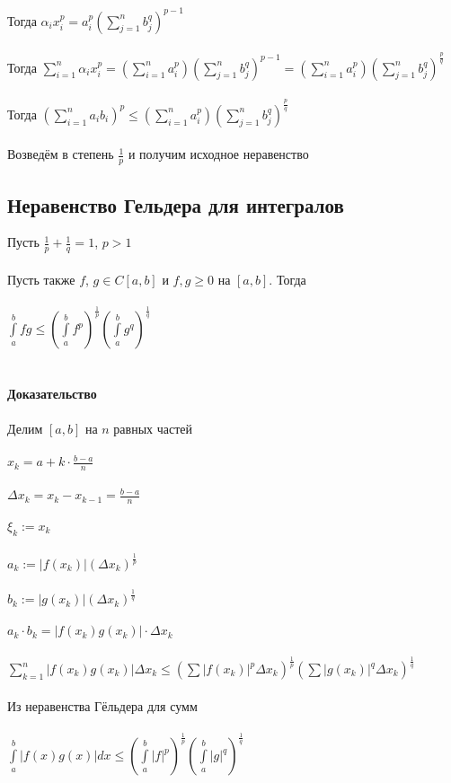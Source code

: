 \documentclass[../main.tex]{subfiles}
\begin{document}
Тогда $\alpha_i x_i^p = a_i^p(\sum\limits_{j = 1}^n b_j^q)^{p - 1}$\\\\
Тогда $\sum\limits_{i = 1}^n \alpha_i x_i^p = (\sum\limits_{i = 1}^n a_i^p)(\sum\limits_{j = 1}^n b_j^q)^{p - 1} = (\sum\limits_{i = 1}^n a_i^p)(\sum\limits_{j = 1}^n b_j^q)^{\frac{p}{q}}$\\\\
Тогда $(\sum_{i = 1}^n a_i b_i)^p \leq (\sum\limits_{i = 1}^n a_i^p)(\sum\limits_{j = 1}^n b_j^q)^{\frac{p}{q}}$\\\\
Возведём в степень $\frac{1}{p}$ и получим исходное неравенство

\newpage


\subsection{Неравенство Гельдера для интегралов}
Пусть $\frac{1}{p} + \frac{1}{q} = 1$, $p > 1$\\\\
Пусть также $f$, $g \in C[a, b]$ и $f, g \geq 0$ на $[a, b]$. Тогда\\\\
$\int\limits^b_a fg \leq \left(\int\limits^b_a f^p\right)^{\frac{1}{p}} \left(\int\limits^b_a g^q\right)^{\frac{1}{q}}$\\\\\\
\textbf{Доказательство}\\\\
Делим $[a, b]$ на $n$ равных частей\\\\
$x_k = a + k \cdot \frac{b - a}{n}$\\\\
$\Delta x_k = x_k - x_{k - 1} = \frac{b - a}{n}$\\\\
$\xi_k := x_k$\\\\
$a_k := |f(x_k)|(\Delta x_k)^{\frac{1}{p}}$\\\\
$b_k := |g(x_k)|(\Delta x_k)^{\frac{1}{q}}$\\\\
$a_k \cdot b_k = |f(x_k)g(x_k)| \cdot \Delta x_k$\\\\
$\sum\limits_{k = 1}^n |f(x_k) g(x_k)| \Delta x_k \leq (\sum |f(x_k)|^p \Delta x_k)^{\frac{1}{p}}(\sum|g(x_k)|^q \Delta x_k)^{\frac{1}{q}}$\\\\
Из неравенства Гёльдера для сумм\\\\
$\int\limits^b_a |f(x) g(x)| dx \leq (\int\limits^b_a |f|^p)^{\frac{1}{p}}(\int\limits^b_a |g|^q)^{\frac{1}{q}}$
\end{document}

